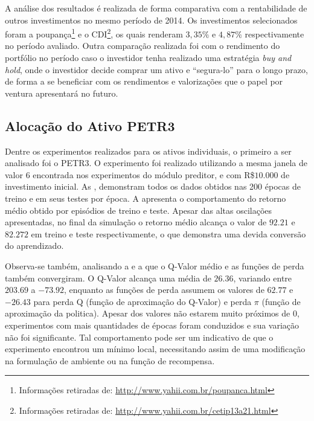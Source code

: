 A análise dos resultados é realizada de forma comparativa com a rentabilidade de outros investimentos no mesmo período de 2014. Os investimentos selecionados foram a poupança\footnote{Informações retiradas de: \url{http://www.yahii.com.br/poupanca.html}} e o \acrfull{CDI}\footnote{Informações retiradas de: \url{http://www.yahii.com.br/cetip13a21.html}}, os quais renderam $3,35\%$ e $4,87\%$ respectivamente no período avaliado. Outra comparação realizada foi com o rendimento do portfólio no período caso o investidor tenha realizado uma estratégia \emph{buy and hold}, onde o investidor decide comprar um ativo e ``segura-lo'' para o longo prazo, de forma a se beneficiar com os rendimentos e valorizações que o papel por ventura apresentará no futuro.

\subsection{Alocação do Ativo PETR3}

Dentre os experimentos realizados para os ativos individuais, o primeiro a ser analisado foi o PETR3. O experimento foi realizado utilizando a mesma janela de valor $6$ encontrada nos experimentos do módulo preditor, e com R\$$10.000$ de investimento inicial. As , demonstram todos os dados obtidos nas 200 épocas de treino e em seus testes por época. A  apresenta o comportamento do retorno médio obtido por episódios de treino e teste. Apesar das altas oscilações apresentadas, no final da simulação o retorno médio alcança o valor de $92.21$ e $82.272$ em treino e teste respectivamente, o que demonstra uma devida conversão do aprendizado.


Observa-se também, analisando a  e a  que o Q-Valor médio e as funções de perda também convergiram. O Q-Valor alcança uma média de $26.36$, variando entre $203.69$ a $-73.92$, enquanto as funções de perda assumem os valores de $62.77$ e $-26.43$ para perda Q (função de aproximação do Q-Valor) e perda $\pi$ (função de aproximação da politica). Apesar dos valores não estarem muito próximos de $0$, experimentos com mais quantidades de épocas foram conduzidos e sua variação não foi significante. Tal comportamento pode ser um indicativo de que o experimento encontrou um mínimo local, necessitando assim de uma modificação na formulação de ambiente ou na função de recompensa.

